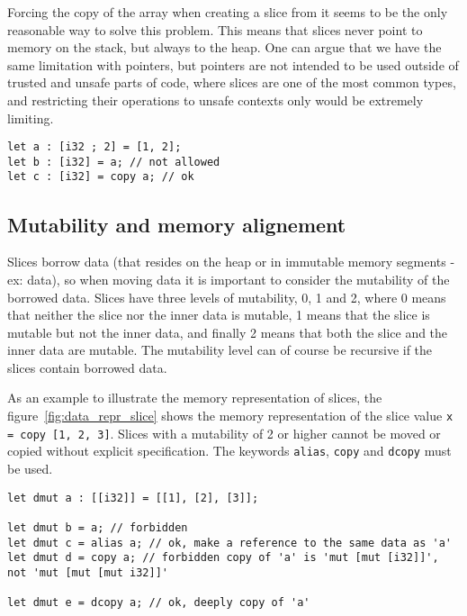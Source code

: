 Forcing the copy of the array when creating a slice from it seems to be the only
reasonable way to solve this problem. This means that slices never point to
memory on the stack, but always to the heap. One can argue that we have the same
limitation with pointers, but pointers are not intended to be used outside of
trusted and unsafe parts of code, where slices are one of the most common types,
and restricting their operations to unsafe contexts only would be extremely
limiting.

\begin{lstlisting}[style=coloredverbatim]
let a : [i32 ; 2] = [1, 2];
let b : [i32] = a; // not allowed
let c : [i32] = copy a; // ok
\end{lstlisting}



\subsection{Mutability and memory alignement}

Slices borrow data (that resides on the heap or in immutable memory segments -
ex: data), so when moving data it is important to consider the mutability of the
borrowed data. Slices have three levels of mutability, 0, 1 and 2, where 0 means
that neither the slice nor the inner data is mutable, 1 means that the slice is
mutable but not the inner data, and finally 2 means that both the slice and the
inner data are mutable. The mutability level can of course be recursive if the
slices contain borrowed data.


As an example to illustrate the memory representation of slices, the
figure~\ref{fig:data_repr_slice} shows the memory representation of the slice
value \texttt{x = copy [1, 2, 3]}. Slices with a mutability of 2 or higher
cannot be moved or copied without explicit specification. The keywords
\texttt{alias}, \texttt{copy} and \texttt{dcopy} must be used.

\begin{lstlisting}[style=coloredverbatim]
let dmut a : [[i32]] = [[1], [2], [3]];

let dmut b = a; // forbidden
let dmut c = alias a; // ok, make a reference to the same data as 'a'
let dmut d = copy a; // forbidden copy of 'a' is 'mut [mut [i32]]', not 'mut [mut [mut i32]]'

let dmut e = dcopy a; // ok, deeply copy of 'a'
\end{lstlisting}



